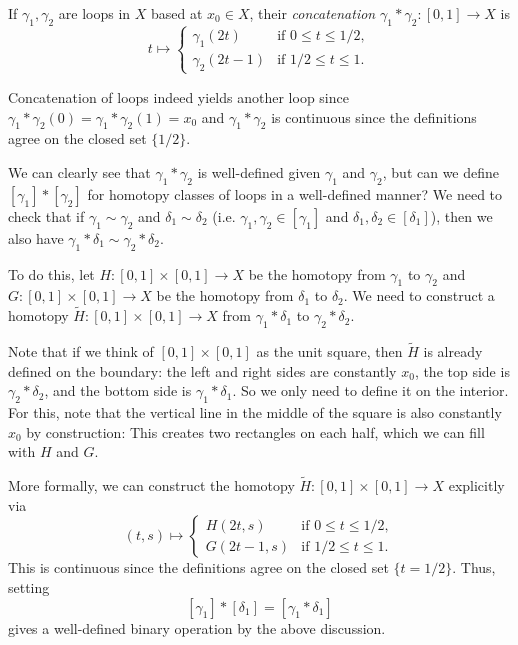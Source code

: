 \begin{definition}
  If $\gamma_1, \gamma_2$ are loops in $X$ based
  at $x_0 \in X$, their \emph{concatenation}
  $\gamma_1 * \gamma_2 : [0, 1] \to X$ is
  \[
    t \mapsto
    \begin{cases}
      \gamma_1(2t) & \text{if } 0 \le t \le 1 / 2, \\
      \gamma_2(2t - 1) & \text{if } 1 / 2 \le t \le 1.
    \end{cases}
  \]
\end{definition}

\begin{remark}
  Concatenation of loops indeed yields another loop
  since $\gamma_1 * \gamma_2(0) = \gamma_1 * \gamma_2(1) = x_0$
  and $\gamma_1 * \gamma_2$ is continuous since
  the definitions agree on the closed
  set $\{1 / 2\}$.
\end{remark}

\begin{remark}
  We can clearly see that $\gamma_1 * \gamma_2$ is
  well-defined given $\gamma_1$ and $\gamma_2$,
  but can we define $[\gamma_1] * [\gamma_2]$
  for homotopy classes of loops in a well-defined
  manner? We need to check
  that if $\gamma_1 \sim \gamma_2$ and $\delta_1 \sim \delta_2$
  (i.e. $\gamma_1, \gamma_2 \in [\gamma_1]$ and
  $\delta_1, \delta_2 \in [\delta_1]$), then we
  also have
  $\gamma_1 * \delta_1 \sim \gamma_2 * \delta_2$.

  To do this, let $H : [0, 1] \times [0, 1] \to X$
  be the homotopy from $\gamma_1$ to $\gamma_2$ and
  $G : [0, 1] \times [0, 1] \to X$ be the homotopy
  from $\delta_1$ to $\delta_2$. We need to construct
  a homotopy $\widetilde{H} : [0, 1] \times [0, 1] \to X$
  from $\gamma_1 * \delta_1$ to $\gamma_2 * \delta_2$.

  Note that if we think of $[0, 1] \times [0, 1]$
  as the unit square, then $\widetilde{H}$ is
  already defined on the boundary: the left and right
  sides are constantly $x_0$, the top side is
  $\gamma_2 * \delta_2$, and the bottom side is
  $\gamma_1 * \delta_1$. So we only need
  to define it on the interior.
  For this, note that the vertical line in
  the middle of the square is also constantly
  $x_0$ by construction: This creates two rectangles
  on each half, which we can fill with $H$ and $G$.

  More formally, we can construct the homotopy
  $\widetilde{H} : [0, 1] \times [0, 1] \to X$
  explicitly via
  \[
    (t, s) \mapsto
    \begin{cases}
      H(2t, s) & \text{if } 0 \le t \le 1 / 2, \\
      G(2t - 1, s) & \text{if } 1 / 2 \le t \le 1.
    \end{cases}
  \]
  This is continuous since the definitions agree
  on the closed set $\{t = 1 / 2\}$. Thus, setting
  \[
    [\gamma_1] * [\delta_1] = [\gamma_1 * \delta_1]
  \]
  gives a well-defined binary operation by the above
  discussion.
\end{remark}

